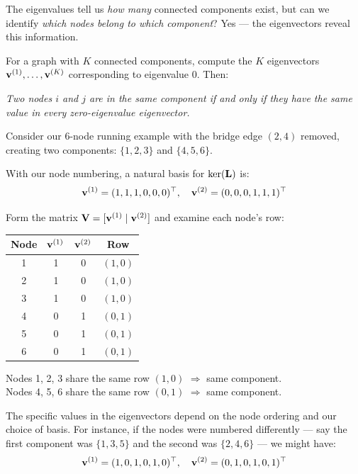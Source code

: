 \begin{notechapter}
The eigenvalues tell us \emph{how many} connected components exist, but can we identify \emph{which nodes belong to which component}? Yes --- the eigenvectors reveal this information.

\begin{keyidea}
For a graph with $K$ connected components, compute the $K$ eigenvectors $\mathbf{v}^{(1)}, \ldots, \mathbf{v}^{(K)}$ corresponding to eigenvalue $0$. Then:
\begin{center}
\emph{Two nodes $i$ and $j$ are in the same component if and only if they have the same value in every zero-eigenvalue eigenvector.}
\end{center}
\end{keyidea}

\begin{example}
Consider our 6-node running example with the bridge edge $(2,4)$ removed, creating two components: $\{1, 2, 3\}$ and $\{4, 5, 6\}$.

With our node numbering, a natural basis for $\ker(\mathbf{L})$ is:
\[
\mathbf{v}^{(1)} = (1,1,1,0,0,0)^\top, \quad \mathbf{v}^{(2)} = (0,0,0,1,1,1)^\top
\]

Form the matrix $\mathbf{V} = [\mathbf{v}^{(1)} \mid \mathbf{v}^{(2)}]$ and examine each node's row:

\begin{center}
\begin{tabular}{c|cc|c}
Node & $\mathbf{v}^{(1)}$ & $\mathbf{v}^{(2)}$ & Row \\
\hline
1 & 1 & 0 & $(1, 0)$ \\
2 & 1 & 0 & $(1, 0)$ \\
3 & 1 & 0 & $(1, 0)$ \\
4 & 0 & 1 & $(0, 1)$ \\
5 & 0 & 1 & $(0, 1)$ \\
6 & 0 & 1 & $(0, 1)$ \\
\end{tabular}
\end{center}

Nodes 1, 2, 3 share the same row $(1, 0)$ $\Rightarrow$ same component.\\
Nodes 4, 5, 6 share the same row $(0, 1)$ $\Rightarrow$ same component.
\end{example}

\begin{remark}
The specific values in the eigenvectors depend on the node ordering and our choice of basis. For instance, if the nodes were numbered differently --- say the first component was $\{1, 3, 5\}$ and the second was $\{2, 4, 6\}$ --- we might have:
\[
\mathbf{v}^{(1)} = (1,0,1,0,1,0)^\top, \quad \mathbf{v}^{(2)} = (0,1,0,1,0,1)^\top
\]


\end{remark}
\end{notechapter}
